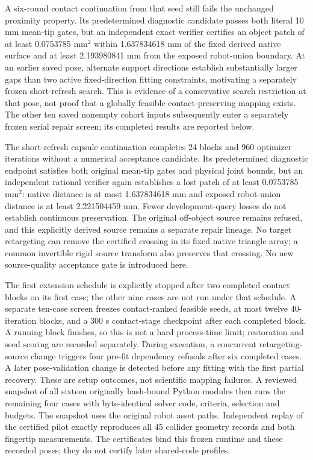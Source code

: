 \documentclass[10pt,letterpaper]{article}
\begin{document}
A six-round contact continuation from that seed still fails the unchanged
proximity property. Its predetermined diagnostic candidate passes both literal
10 mm mean-tip gates, but an independent exact verifier certifies an object
patch of at least 0.0753785 $\mathrm{mm}^2$ within 1.637834618 mm of the fixed
derived native surface and at least 2.193980841 mm from the exposed robot-union
boundary. At an earlier saved pose, alternate support directions establish
substantially larger gaps than two active fixed-direction fitting constraints,
motivating a separately frozen short-refresh search. This is evidence of a
conservative search restriction at that pose, not proof that a globally feasible
contact-preserving mapping exists. The other ten saved nonempty cohort inputs subsequently enter a separately
frozen serial repair screen; its completed results are reported below.

The short-refresh capsule continuation completes 24 blocks and 960 optimizer
iterations without a numerical acceptance candidate. Its predetermined diagnostic
endpoint satisfies both original mean-tip gates and physical joint bounds,
but an independent rational verifier again establishes a lost patch of at least
0.0753785 $\mathrm{mm}^2$: native distance is at most 1.637834618 mm and
exposed robot-union distance is at least 2.221504459 mm. Fewer development-query
losses do not establish continuous preservation. The original off-object source
remains refused, and this explicitly derived source remains a separate repair
lineage. No target retargeting can remove the certified crossing in its fixed
native triangle array; a common invertible rigid source transform also preserves
that crossing. No new source-quality acceptance gate is introduced here.

The first extension schedule is explicitly stopped after two completed contact
blocks on its first case; the other nine cases are not run under that schedule.
A separate ten-case screen freezes contact-ranked feasible seeds, at most twelve
40-iteration blocks, and a 300 s contact-stage checkpoint after each completed
block. A running block finishes, so this is not a hard process-time limit;
restoration and seed scoring are recorded separately. During execution,
a concurrent retargeting-source change triggers four pre-fit dependency refusals
after six completed cases. A later pose-validation change is detected before
any fitting with the first partial recovery. These are setup outcomes, not scientific
mapping failures. A reviewed snapshot of all sixteen originally hash-bound Python modules then
runs the remaining four cases with byte-identical solver code, criteria,
selection and budgets. The snapshot uses the original robot asset paths. Independent replay
of the certified pilot exactly reproduces all 45 collider geometry records and
both fingertip measurements. The certificates bind this frozen runtime and
these recorded poses; they do not certify later shared-code profiles.
\end{document}
